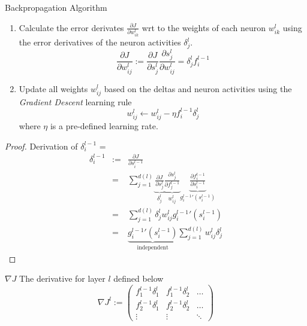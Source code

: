 \documentclass[11pt,a4paper]{article}
\begin{document}
\begin{proposition}{Backpropagation Algorithm}
\begin{enumerate}
      \item Calculate the error derivates $\frac{\partial J}{\partial w_{ik}^l}$ wrt to the weights of each neuron $w_{ik}^l$ using the error derivatives of the neuron activities $\delta_j^l$.
      \[ \frac{\partial J}{\partial w_{ij}^l}:=\frac{\partial J}{\partial s_j^l}\frac{\partial s_j^l}{\partial w_{ij}^l}=\delta_j^lf_i^{l-1} \]

      \item Update all weights $w_{ij}^l$ based on the deltas and neuron activities using the \textit{Gradient Descent} learning rule
      \[ w_{ij}^l\leftarrow w_{ij}^l-\eta f_i^{l-1}\delta_j^l\]
      where $\eta$ is a pre-defined learning rate.
    \end{enumerate}
  \end{proposition}

  \begin{proof}{Derivation of $\delta_i^{l-1}$}
    \everymath={\displaystyle}
    \[\begin{array}{rrl}
      \delta_i^{l-1}&:=&\frac{\partial J}{\partial s_i^{l-1}}\\
      &=&\sum_{j=1}^{d(l)}\underbrace{\frac{\partial J}{\partial s_j^l}}_{\delta_j^l} \underbrace{\frac{\partial s_j^l}{\partial f_j^{l-1}}}_{w_{ij}^l} \underbrace{\frac{\partial f_i^{l-1}}{\partial s_i^{l-1}}}_{{g^{l-1}_i}'(s_i^{l-1})}\\
      &=&\sum_{j=1}^{d(l)}\delta_j^lw_{ij}^l{g_i^{l-1}}'(s_i^{l-1})\\
      &=&\underbrace{{g_i^{l-1}}'(s_i^{l-1})}_\text{independent}\sum_{j=1}^{d(l)}w_{ij}^l\delta_j^l
      \end{array}\]
  \end{proof}

  \begin{definition}{$\nabla J$}
    The derivative for layer $l$ defined below
    \[ \nabla J^l:=\begin{pmatrix}
      f_1^{l-1}\delta_1^l & f_1^{l-1}\delta_2^l & \dots \\
      f_2^{l-1}\delta_1^l & f_2^{l-1}\delta_2^l & \dots \\
      \vdots & \vdots & \ddots
    \end{pmatrix} \] %
  \end{definition}
\end{document}
